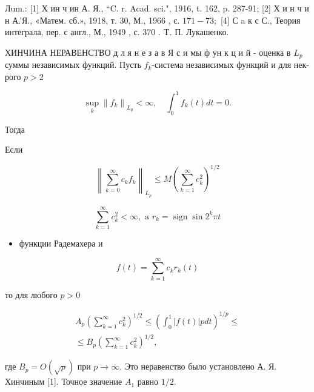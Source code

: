 \documentclass[10pt]{article}
\begin{document}
Лum.: [1] Х ин ч ин А. Я., “C. r. Acad. sci.", 1916, t. 162, p. 287-91; [2] Х и н ч и н А.'Я., «Матем. сб.», 1918, т. 30, М., 1966 , с. $171-73 ;$ [4] С a к с С., Теория интеграла, пер. с англ., М., 1949 , с. 370 . T. П. Лукашенко.



ХИНЧИНА НЕРАВЕНСТВО д л я н $е$ з а в Я с и мы ф ун к ц и й - оценка в $L_{p}$ суммы независимых функций. Пусть $f_{k}$-система независимых функций и для нек-рого $p>2$



\[

\sup _{k}\left\|f_{k}\right\|_{L_{p}}<\infty, \quad \int_{0}^{1} f_{k}(t) d t=0 .

\]



Тогда



Если



\[

\left\|\sum_{k=0}^{\infty} c_{k} f_{k}\right\|_{L_{p}} \leqslant M\left(\sum_{k=1}^{\infty} c_{k}^{2}\right)^{1 / 2}

\]



\[

\sum_{k=1}^{\infty} c_{k}^{2}<\infty, \text { a } r_{k}=\operatorname{sign} \sin 2^{k} \pi t

\]



\begin{itemize}

  \item функции Радемахера и

\end{itemize}



\[

f(t)=\sum_{k=1}^{\infty} c_{k} r_{k}(t)

\]



то для любого $p>0$



\[

\begin{gathered}

A_{p}\left(\sum_{k=1}^{\infty} c_{k}^{2}\right)^{1 / 2} \leqslant\left(\int_{0}^{1}|f(t)| p d t\right)^{1 / p} \leqslant \\

\leqslant B_{p}\left(\sum_{k=1}^{\infty} c_{k}^{2}\right)^{1 / 2},

\end{gathered}

\]



где $B_{p}=O(\sqrt{p})$ при $p \rightarrow \infty$. Это неравенство было установлено А. Я. Хинчиным [1]. Точное значение $A_{1}$ равно $1 / 2$.
\end{document}
